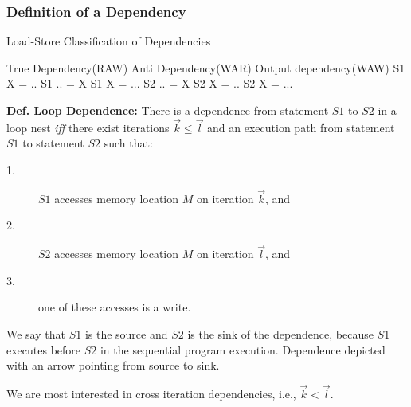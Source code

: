 \documentclass{beamer}
\newcommand{\emp}[1]{\textcolor{DikuRed}{ #1}}
\begin{document}
\begin{frame}[fragile,t]
  \frametitle{Definition of a Dependency} %
\vspace{-2ex}
\begin{block}{Load-Store Classification of Dependencies}
\begin{colorcode}
True Dependency(RAW)  Anti Dependency(WAR)  Output dependency(WAW)
   S1    X  = ..         S1    .. = X          S1    X = ...            
   S2    .. = X          S2    X  = ..         S2    X = ...
\end{colorcode}
\end{block} 

\smallskip

{\bf Def. Loop Dependence:} There is a dependence from statement $S1$ to $S2$
in a loop nest {\em iff} there exist iterations $\vec{k} \leq \vec{l}$ and
an execution path from statement $S1$ to statement $S2$ \emp{such that:}
\begin{description}
    \item[1.] $S1$ accesses memory location $M$ on iteration $\vec{k}$, and
    \item[2.] $S2$ accesses memory location $M$ on iteration $\vec{l}$, and
    \item[3.] one of these accesses is a write.
\end{description}
\medskip

\emp{We say that $S1$ is the source and $S2$ is the sink of the dependence}, 
because $S1$ executes before $S2$ in the sequential program execution.
Dependence depicted with an arrow pointing from source to sink.\pause

\medskip
\emp{We are most interested in cross iteration dependencies, i.e., $\vec{k} < \vec{l}$.}

\end{frame}
\end{document}
